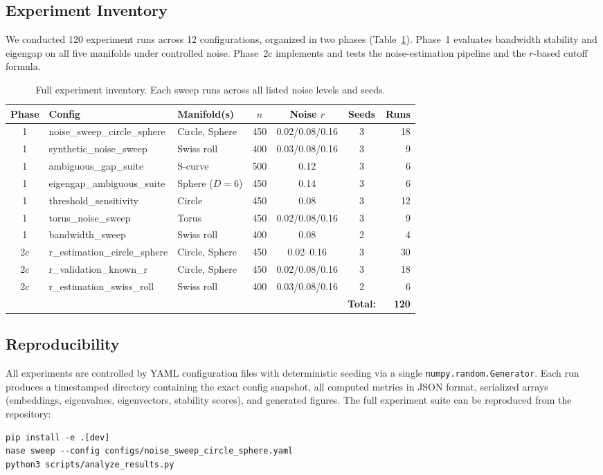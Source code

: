\documentclass{article}
\begin{document}
\subsection{Experiment Inventory}

We conducted 120 experiment runs across 12 configurations, organized in two phases (Table~\ref{tab:experiments}). Phase~1 evaluates bandwidth stability and eigengap on all five manifolds under controlled noise. Phase~2c implements and tests the noise-estimation pipeline and the $r$-based cutoff formula.

\begin{table}[htbp]
\caption{Full experiment inventory. Each sweep runs across all listed noise levels and seeds.}
\label{tab:experiments}
\centering
\small
\begin{tabular}{@{}cllcccr@{}}
\toprule
Phase & Config & Manifold(s) & $n$ & Noise $r$ & Seeds & Runs \\
\midrule
1 & noise\_sweep\_circle\_sphere & Circle, Sphere & 450 & 0.02/0.08/0.16 & 3 & 18 \\
1 & synthetic\_noise\_sweep & Swiss roll & 400 & 0.03/0.08/0.16 & 3 & 9 \\
1 & ambiguous\_gap\_suite & S-curve & 500 & 0.12 & 3 & 6 \\
1 & eigengap\_ambiguous\_suite & Sphere ($D{=}6$) & 450 & 0.14 & 3 & 6 \\
1 & threshold\_sensitivity & Circle & 450 & 0.08 & 3 & 12 \\
1 & torus\_noise\_sweep & Torus & 450 & 0.02/0.08/0.16 & 3 & 9 \\
1 & bandwidth\_sweep & Swiss roll & 400 & 0.08 & 2 & 4 \\
\midrule
2c & r\_estimation\_circle\_sphere & Circle, Sphere & 450 & 0.02--0.16 & 3 & 30 \\
2c & r\_validation\_known\_r & Circle, Sphere & 450 & 0.02/0.08/0.16 & 3 & 18 \\
2c & r\_estimation\_swiss\_roll & Swiss roll & 400 & 0.03/0.08/0.16 & 2 & 6 \\
\midrule
& & & & & \textbf{Total:} & \textbf{120} \\
\bottomrule
\end{tabular}
\end{table}

\subsection{Reproducibility}

All experiments are controlled by YAML configuration files with deterministic seeding via a single \texttt{numpy.random.Generator}. Each run produces a timestamped directory containing the exact config snapshot, all computed metrics in JSON format, serialized arrays (embeddings, eigenvalues, eigenvectors, stability scores), and generated figures. The full experiment suite can be reproduced from the repository:
\begin{verbatim}
pip install -e .[dev]
nase sweep --config configs/noise_sweep_circle_sphere.yaml
python3 scripts/analyze_results.py
\end{verbatim}
\end{document}
